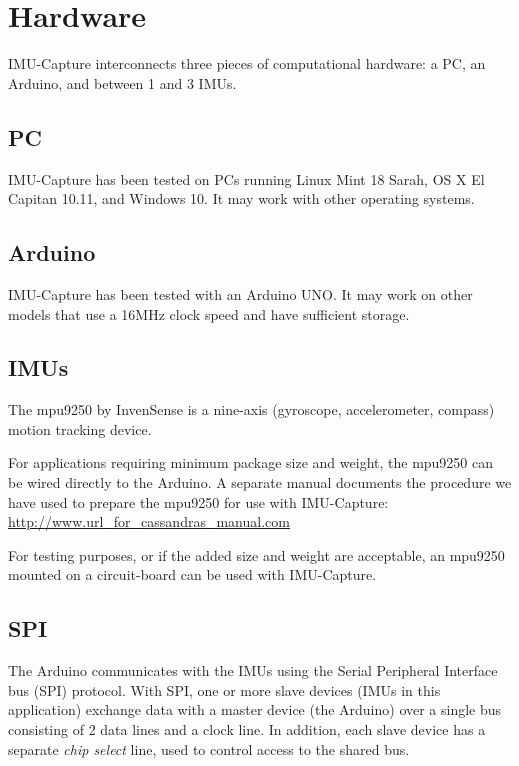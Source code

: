 \documentclass[11pt,letterpaper,article,oneside]{memoir}
\newcommand{\name}{IMU-Capture}
\begin{document}

\chapter{Hardware}

\name{} interconnects three pieces of computational hardware: a PC, an Arduino,
and between 1 and 3 IMUs.


\section{PC}
\name{} has been tested on PCs running Linux Mint 18 Sarah, OS X El Capitan
10.11, and Windows 10. It may work with other operating systems.


\section{Arduino}
\name{} has been tested with an Arduino UNO. It may work on other models that
use a 16MHz clock speed and have sufficient storage.


\section{IMUs}
The mpu9250 by InvenSense is a nine-axis (gyroscope, accelerometer, compass)
motion tracking device.

For applications requiring minimum package size and weight,
the mpu9250 can be wired directly to the Arduino. A separate manual
documents the procedure we have used to prepare the mpu9250 for use with
\name{}:
\url{http://www.url_for_cassandras_manual.com}

For testing purposes, or if the added size and weight are acceptable, an mpu9250
mounted on a circuit-board can be used with \name{}.


\section{SPI}
The Arduino communicates with the IMUs using the Serial Peripheral Interface bus
(SPI) protocol. With SPI, one or more slave devices (IMUs in this application)
exchange data with a master device (the Arduino) over a single bus consisting of
2 data lines and a clock line. In addition, each slave device has a separate
\emph{chip select} line, used to control access to the shared bus.
\end{document}
